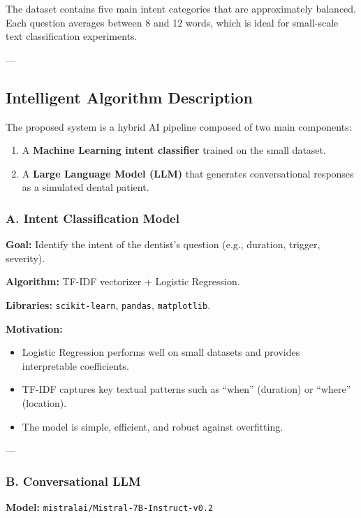 \noindent
The dataset contains five main intent categories that are approximately balanced. Each question averages between 8 and 12 words, which is ideal for small-scale text classification experiments.

---

\subsection{Intelligent Algorithm Description}

The proposed system is a hybrid AI pipeline composed of two main components:
\begin{enumerate}
    \item A \textbf{Machine Learning intent classifier} trained on the small dataset.
    \item A \textbf{Large Language Model (LLM)} that generates conversational responses as a simulated dental patient.
\end{enumerate}

\subsubsection*{A. Intent Classification Model}

\textbf{Goal:} Identify the intent of the dentist's question (e.g., duration, trigger, severity).

\textbf{Algorithm:} TF-IDF vectorizer + Logistic Regression.

\textbf{Libraries:} \texttt{scikit-learn}, \texttt{pandas}, \texttt{matplotlib}.

\textbf{Motivation:}
\begin{itemize}
    \item Logistic Regression performs well on small datasets and provides interpretable coefficients.
    \item TF-IDF captures key textual patterns such as ``when'' (duration) or ``where'' (location).
    \item The model is simple, efficient, and robust against overfitting.
\end{itemize}

---

\subsubsection*{B. Conversational LLM}

\textbf{Model:} \texttt{mistralai/Mistral-7B-Instruct-v0.2}

